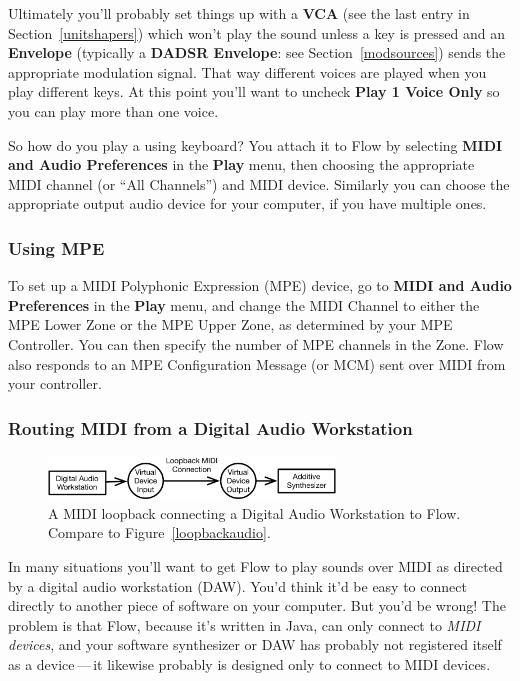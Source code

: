 \documentclass{article}
\newcommand\name{Flow}
\begin{document}
Ultimately you'll probably set things up with a {\bf VCA} (see the last entry in Section~\ref{unitshapers}) which won't play the sound unless a key is pressed and an {\bf Envelope} (typically a {\bf DADSR Envelope}: see Section~\ref{modsources}) sends the appropriate modulation signal.  That way different voices are played when you play different keys.  At this point you'll want to uncheck {\bf Play 1 Voice Only} so you can play more than one voice.

So how do you play a using keyboard?  You attach it to {\name} by selecting {\bf MIDI and Audio Preferences} in the {\bf Play} menu, then choosing the appropriate MIDI channel (or ``All Channels'') and MIDI device.  Similarly you can choose the appropriate output audio device for your computer, if you have multiple ones.

\subsubsection{Using MPE}

To set up a MIDI Polyphonic Expression (MPE) device, go to {\bf MIDI and Audio Preferences} in the {\bf Play} menu, and change the MIDI Channel to either the MPE Lower Zone or the MPE Upper Zone, as determined by your MPE Controller.  You can then specify the number of MPE channels in the Zone.  {\name} also responds to an MPE Configuration Message (or MCM) sent over MIDI from your controller.

\subsubsection{Routing MIDI from a Digital Audio Workstation}
\label{routingmidi}

\begin{figure}
\begin{center}\vspace{-1em}\includegraphics[width=3in]{loopbackmidi}\end{center}
\vspace{-1em}
\caption{A MIDI loopback connecting a Digital Audio Workstation to {\name}.  Compare to Figure~\ref{loopbackaudio}.}\label{loopbackmidi}
\end{figure}

In many situations you'll want to get {\name} to play sounds over MIDI  as directed by a digital audio workstation (DAW).   You'd think it'd be easy to connect directly to another piece of software on your computer.  But you'd be wrong!  The problem is that {\name}, because it's written in Java, can only connect to {\it MIDI devices}, and your software synthesizer or DAW has probably not registered itself as a device\,---\,it likewise probably is designed only to connect to MIDI devices.
\end{document}
